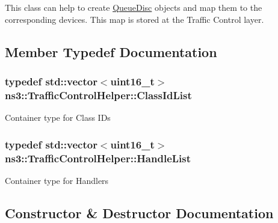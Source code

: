 This class can help to create \hyperlink{classns3_1_1QueueDisc}{Queue\+Disc} objects and map them to the corresponding devices. This map is stored at the Traffic Control layer. 

\subsection{Member Typedef Documentation}
\subsubsection[{\texorpdfstring{Class\+Id\+List}{ClassIdList}}]{\setlength{\rightskip}{0pt plus 5cm}typedef std\+::vector$<$uint16\+\_\+t$>$ {\bf ns3\+::\+Traffic\+Control\+Helper\+::\+Class\+Id\+List}}\hypertarget{classns3_1_1TrafficControlHelper_aa42018a8e7faa9b7d1d4d2320014ef56}{}\label{classns3_1_1TrafficControlHelper_aa42018a8e7faa9b7d1d4d2320014ef56}
Container type for Class I\+Ds 
\subsubsection[{\texorpdfstring{Handle\+List}{HandleList}}]{\setlength{\rightskip}{0pt plus 5cm}typedef std\+::vector$<$uint16\+\_\+t$>$ {\bf ns3\+::\+Traffic\+Control\+Helper\+::\+Handle\+List}}\hypertarget{classns3_1_1TrafficControlHelper_a0077f89ad2e6f94f6f108eca4f3a8534}{}\label{classns3_1_1TrafficControlHelper_a0077f89ad2e6f94f6f108eca4f3a8534}
Container type for Handlers 

\subsection{Constructor \& Destructor Documentation}
